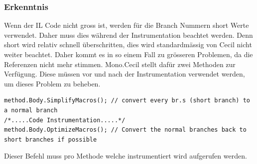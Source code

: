 \documentclass[10pt,a4paper]{article}
\begin{document}
\subsubsection{Erkenntnis}
\begin{flushleft}
Wenn der IL Code nicht gross ist, werden für die Branch Nummern short Werte verwendet.
Daher muss dies während der Instrumentation beachtet werden. Denn short wird relativ schnell überschritten, dies wird standardmässig von Cecil nicht weiter beachtet. Daher kommt es in so einem Fall zu grösseren Problemen, da die Referenzen nicht mehr stimmen.
Mono.Cecil stellt dafür zwei Methoden zur Verfügung. Diese müssen vor und nach der Instrumentation verwendet werden, um dieses Problem zu beheben.
\begin{lstlisting} 
method.Body.SimplifyMacros(); // convert every br.s (short branch) to a normal branch
/*.....Code Instrumentation.....*/
method.Body.OptimizeMacros(); // Convert the normal branches back to short branches if possible
\end{lstlisting}
Dieser Befehl muss pro Methode welche instrumentiert wird aufgerufen werden.
\end{flushleft}
\end{document}

